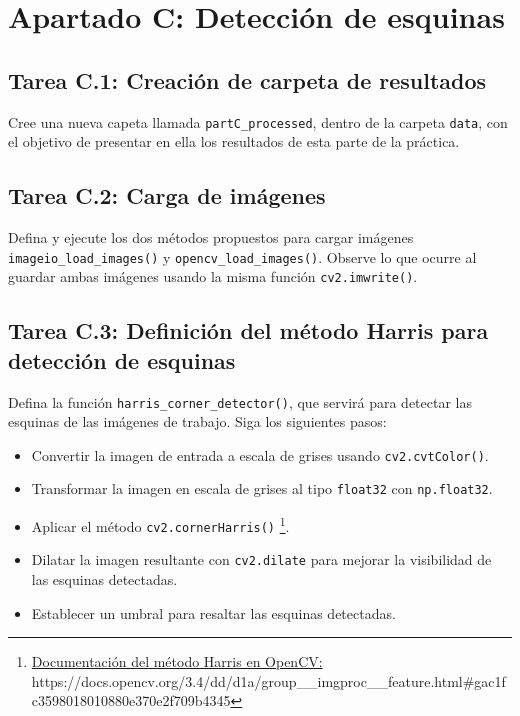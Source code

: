 \chapter{Apartado C: \textbf{Detección de esquinas}}
\label{chapter:tarea_c}


\section*{Tarea C.1: Creación de carpeta de resultados}
{}

Cree una nueva capeta llamada \texttt{partC\_processed}, dentro de la carpeta \texttt{data}, con el objetivo de presentar en ella los resultados de esta parte de la práctica.

\section*{Tarea C.2: Carga de imágenes}

Defina y ejecute los dos métodos propuestos para cargar imágenes \texttt{imageio\_load\_images()} y \texttt{opencv\_load\_images()}. Observe lo que ocurre al guardar ambas imágenes usando la misma función \texttt{cv2.imwrite()}.

\section*{Tarea C.3: Definición del método  Harris para detección de esquinas}
Defina la función \texttt{harris\_corner\_detector()}, que servirá para detectar las esquinas de las imágenes de trabajo. Siga los siguientes pasos:

\begin{itemize}
    \item Convertir la imagen de entrada a escala de grises usando \texttt{cv2.cvtColor()}.
    \item Transformar la imagen en escala de grises al tipo \texttt{float32} con \texttt{np.float32}.
    \item Aplicar el método \texttt{cv2.cornerHarris()} \footnote{ \href{https://docs.opencv.org/3.4/dd/d1a/group\_\_imgproc\_\_feature.html\#gac1fc3598018010880e370e2f709b4345}{Documentación del método Harris en OpenCV:} \\{https://docs.opencv.org/3.4/dd/d1a/group\_\_imgproc\_\_feature.html\#gac1fc3598018010880e370e2f709b4345}}.
    \item Dilatar la imagen resultante con \texttt{cv2.dilate} para mejorar la visibilidad de las esquinas detectadas.
    \item Establecer un umbral para resaltar las esquinas detectadas.
\end{itemize}

